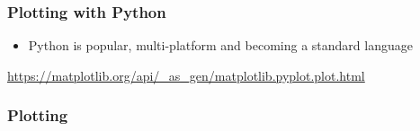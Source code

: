 \documentclass{beamer}
\begin{document}
\begin{frame}
\frametitle{Plotting with Python} 
\begin{itemize}
	\item Python is popular, multi-platform and becoming a standard language\footnotemark 
\end{itemize}


\url{https://matplotlib.org/api/_as_gen/matplotlib.pyplot.plot.html}
\end{frame}

\begin{frame}
\frametitle{Plotting}
\end{frame}
\end{document}
